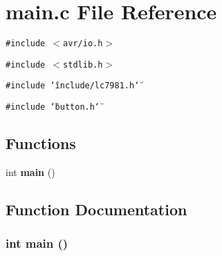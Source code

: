 \section{main.c File Reference}
\label{main_8c}
{\tt \#include $<$avr/io.h$>$}\par
{\tt \#include $<$stdlib.h$>$}\par
{\tt \#include \char`\"{}include/lc7981.h\char`\"{}}\par
{\tt \#include \char`\"{}button.h\char`\"{}}\par
\subsection*{Functions}
\begin{CompactItemize}
\item 
int {\bf main} ()
\end{CompactItemize}


\subsection{Function Documentation}
\subsubsection{\setlength{\rightskip}{0pt plus 5cm}int main ()}\label{main_8c_e66f6b31b5ad750f1fe042a706a4e3d4}


